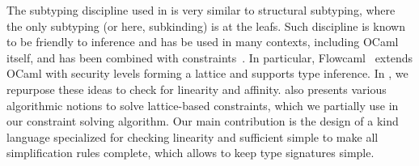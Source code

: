 The subtyping discipline used in \lang is very similar
to structural subtyping, where the only subtyping (or here, subkinding)
is at the leafs.
Such discipline is known to be friendly to inference and has be used in many
contexts, including OCaml itself, and has been combined
with constraints~\citep{DBLP:journals/tapos/OderskySW99,DBLP:conf/sas/TrifonovS96}.
In particular, Flowcaml~\citep{DBLP:conf/popl/PottierS02}
extends OCaml with security levels forming a lattice and supports type inference.
In \lang, we repurpose these ideas to check for linearity and affinity.
\citet{DBLP:conf/aplas/Simonet03} also presents various algorithmic
notions to solve lattice-based constraints, which we partially use
in our constraint solving algorithm. Our main contribution
is the design of a kind language specialized for checking linearity
and sufficient simple to make
all simplification rules complete, which allows to keep type signatures simple.


